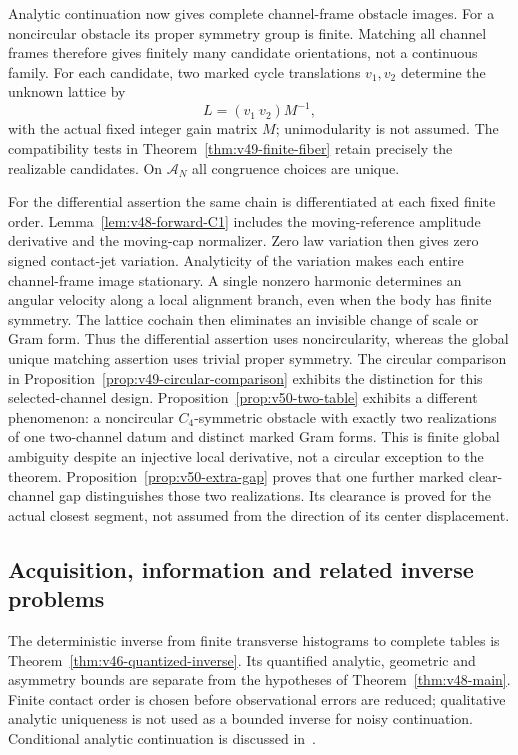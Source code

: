 Analytic continuation now gives complete channel-frame obstacle images.
For a noncircular obstacle its proper symmetry group is finite.  Matching
all channel frames therefore gives finitely many candidate orientations,
not a continuous family.  For each candidate, two marked cycle
translations $v_1,v_2$ determine the unknown lattice by
\[
                      L=(v_1\ v_2)M^{-1},
\]
with the actual fixed integer gain matrix $M$; unimodularity is not
assumed.  The compatibility tests in
Theorem~\ref{thm:v49-finite-fiber} retain precisely the realizable
candidates.  On $\mathscr A_N$ all congruence choices are unique.

For the differential assertion the same chain is differentiated at each
fixed finite order.  Lemma~\ref{lem:v48-forward-C1} includes the
moving-reference amplitude derivative and the moving-cap normalizer.
Zero law variation then gives zero signed contact-jet variation.
Analyticity of the variation makes each entire channel-frame image
stationary.  A single nonzero harmonic determines an angular velocity
along a local alignment branch, even when the body has finite symmetry.
The lattice cochain then eliminates an invisible change of scale or Gram
form.  Thus the differential assertion uses noncircularity, whereas the
global unique matching assertion uses trivial proper symmetry.  The
circular comparison in Proposition~\ref{prop:v49-circular-comparison}
exhibits the distinction for this selected-channel design.
Proposition~\ref{prop:v50-two-table} exhibits a different phenomenon:
a noncircular $C_4$-symmetric obstacle with exactly two realizations of
one two-channel datum and distinct marked Gram forms.  This is finite
global ambiguity despite an injective local derivative, not a circular
exception to the theorem.  Proposition~\ref{prop:v50-extra-gap} proves
that one further marked clear-channel gap distinguishes those two
realizations.  Its clearance is proved for the actual closest segment,
not assumed from the direction of its center displacement.

\subsection{Acquisition, information and related inverse problems}

The deterministic inverse from finite transverse histograms to complete
tables is Theorem~\ref{thm:v46-quantized-inverse}.  Its quantified
analytic, geometric and asymmetry bounds are separate from the hypotheses
of Theorem~\ref{thm:v48-main}.  Finite contact order is chosen before
observational errors are reduced; qualitative analytic uniqueness is not
used as a bounded inverse for noisy continuation.  Conditional analytic
continuation is discussed in~\cite{Trefethen2020}.

